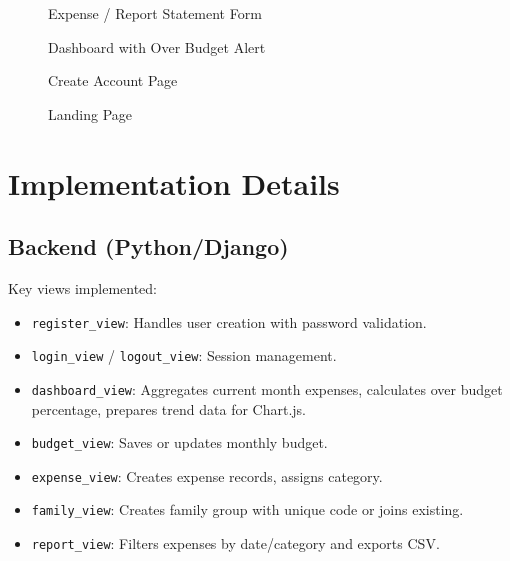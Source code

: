 \documentclass[12pt,a4paper]{article}
\begin{document}
\begin{figure}[H]
\centering
{}
\caption{Expense / Report Statement Form}
\end{figure}

\begin{figure}[H]
\centering
{}
\caption{Dashboard with Over Budget Alert}
\end{figure}

\begin{figure}[H]
\centering
{}
\caption{Create Account Page}
\end{figure}

\begin{figure}[H]
\centering
{}
\caption{Landing Page}
\end{figure}

\section{Implementation Details}

\subsection{Backend (Python/Django)}
Key views implemented:

\begin{itemize}
    \item \texttt{register\_view}: Handles user creation with password validation.
    \item \texttt{login\_view} / \texttt{logout\_view}: Session management.
    \item \texttt{dashboard\_view}: Aggregates current month expenses, calculates over budget percentage, prepares trend data for Chart.js.
    \item \texttt{budget\_view}: Saves or updates monthly budget.
    \item \texttt{expense\_view}: Creates expense records, assigns category.
    \item \texttt{family\_view}: Creates family group with unique code or joins existing.
    \item \texttt{report\_view}: Filters expenses by date/category and exports CSV.
\end{itemize}
\end{document}
